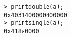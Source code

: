 \begin{center}\begin{minipage}{15cm}\begin{Verbatim}[frame=single]
> printdouble(a);
0x4031400000000000
> printsingle(a);
0x418a0000
\end{Verbatim}
\end{minipage}\end{center}
